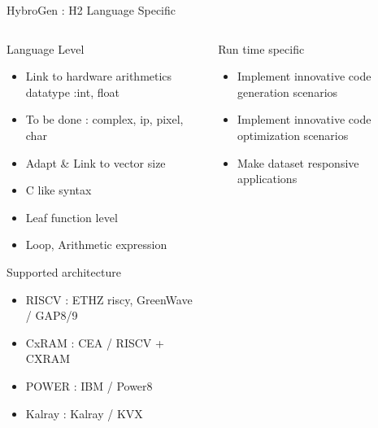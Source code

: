 \begin{Frame}{HybroGen : H2 Language Specific}
 \begin{columns}[t]
  \begin{column}{\BW}
    \begin{block}{Language Level}
      \begin{itemize}
        \item Link to hardware arithmetics datatype :int, float
        \item To be done : complex, ip, pixel, char
        \item Adapt \& Link to vector size
        \item C like syntax
        \item Leaf function level
        \item Loop, Arithmetic expression
      \end{itemize}
    \end{block}
    \begin{block}{Supported architecture}
      \begin{itemize}
      \item RISCV : ETHZ riscy, GreenWave / GAP8/9
      \item CxRAM : CEA / RISCV + CXRAM
      \item POWER : IBM / Power8
      \item Kalray : Kalray / KVX
      \end{itemize}
    \end{block}
  \end{column}
  \begin{column}{\BW}
    \begin{block}{Run time specific}
      \begin{itemize}
      \item Implement innovative code generation scenarios
      \item Implement innovative code optimization scenarios
      \item Make dataset responsive applications
      \end{itemize}
    \end{block}
  \end{column}

 \end{columns}
\end{Frame}

